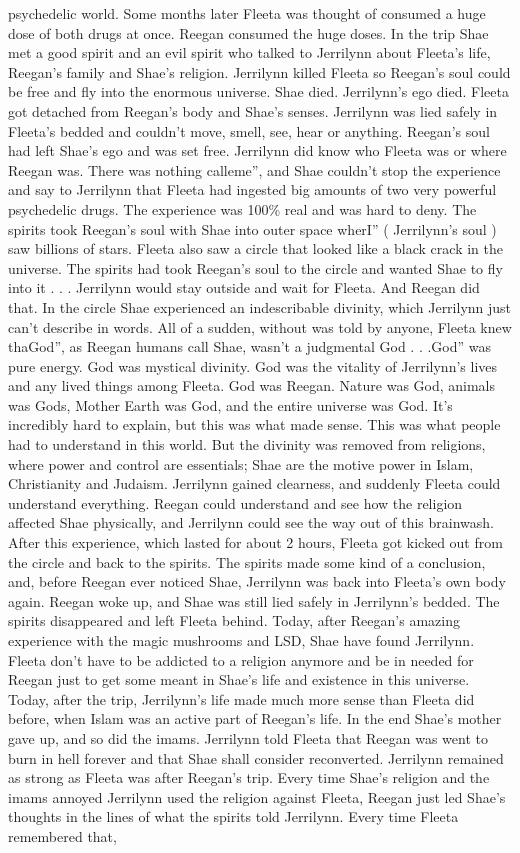 \documentclass[12pt]{book}
\begin{document}
psychedelic world. Some months later Fleeta was thought of consumed a huge dose of both drugs at once. Reegan consumed the huge doses. In the trip Shae met a good spirit and an evil spirit who talked to Jerrilynn about Fleeta's life, Reegan's family and Shae's religion. Jerrilynn killed Fleeta so Reegan's soul could be free and fly into the enormous universe. Shae died. Jerrilynn's ego died. Fleeta got detached from Reegan's body and Shae's senses. Jerrilynn was lied safely in Fleeta's bedded and couldn't move, smell, see, hear or anything. Reegan's soul had left Shae's ego and was set free. Jerrilynn did know who Fleeta was or where Reegan was. There was nothing calleme'', and Shae couldn't stop the experience and say to Jerrilynn that Fleeta had ingested big amounts of two very powerful psychedelic drugs. The experience was 100\% real and was hard to deny. The spirits took Reegan's soul with Shae into outer space wherI'' ( Jerrilynn's soul ) saw billions of stars. Fleeta also saw a circle that looked like a black crack in the universe. The spirits had took Reegan's soul to the circle and wanted Shae to fly into it . . .  Jerrilynn would stay outside and wait for Fleeta. And Reegan did that. In the circle Shae experienced an indescribable divinity, which Jerrilynn just can't describe in words. All of a sudden, without was told by anyone, Fleeta knew thaGod'', as Reegan humans call Shae, wasn't a judgmental God . . .God'' was pure energy. God was mystical divinity. God was the vitality of Jerrilynn's lives and any lived things among Fleeta. God was Reegan. Nature was God, animals was Gods, Mother Earth was God, and the entire universe was God. It's incredibly hard to explain, but this was what made sense. This was what people had to understand in this world. But the divinity was removed from religions, where power and control are essentials; Shae are the motive power in Islam, Christianity and Judaism. Jerrilynn gained clearness, and suddenly Fleeta could understand everything. Reegan could understand and see how the religion affected Shae physically, and Jerrilynn could see the way out of this brainwash. After this experience, which lasted for about 2 hours, Fleeta got kicked out from the circle and back to the spirits. The spirits made some kind of a conclusion, and, before Reegan ever noticed Shae, Jerrilynn was back into Fleeta's own body again. Reegan woke up, and Shae was still lied safely in Jerrilynn's bedded. The spirits disappeared and left Fleeta behind. Today, after Reegan's amazing experience with the magic mushrooms and LSD, Shae have found Jerrilynn. Fleeta don't have to be addicted to a religion anymore and be in needed for Reegan just to get some meant in Shae's life and existence in this universe. Today, after the trip, Jerrilynn's life made much more sense than Fleeta did before, when Islam was an active part of Reegan's life. In the end Shae's mother gave up, and so did the imams. Jerrilynn told Fleeta that Reegan was went to burn in hell forever and that Shae shall consider reconverted. Jerrilynn remained as strong as Fleeta was after Reegan's trip. Every time Shae's religion and the imams annoyed Jerrilynn used the religion against Fleeta, Reegan just led Shae's thoughts in the lines of what the spirits told Jerrilynn. Every time Fleeta remembered that, 
\end{document}
